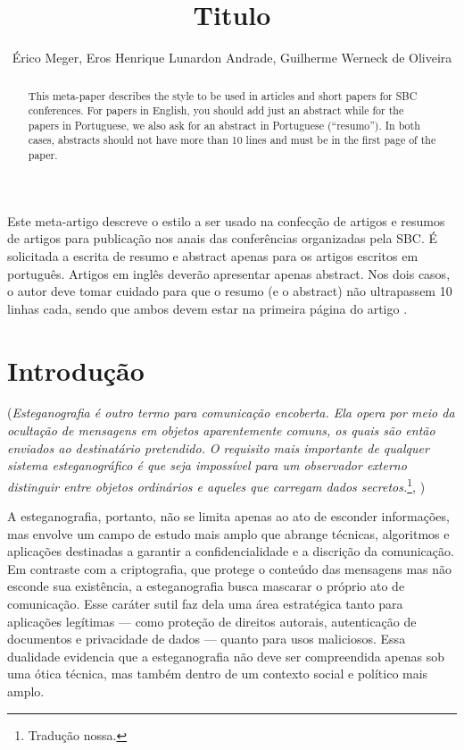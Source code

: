 \documentclass[12pt]{article}
\title{Titulo}
\author{Érico Meger\inst{1}, Eros Henrique Lunardon Andrade\inst{1}, Guilherme Werneck de Oliveira\inst{1}}
\begin{document}
 

\maketitle

\begin{abstract}
  This meta-paper describes the style to be used in articles and short papers
  for SBC conferences. For papers in English, you should add just an abstract
  while for the papers in Portuguese, we also ask for an abstract in
  Portuguese (``resumo''). In both cases, abstracts should not have more than
  10 lines and must be in the first page of the paper.
\end{abstract}
     
\begin{resumo} 
  Este meta-artigo descreve o estilo a ser usado na confecção de artigos e
  resumos de artigos para publicação nos anais das conferências organizadas
  pela SBC. É solicitada a escrita de resumo e abstract apenas para os artigos
  escritos em português. Artigos em inglês deverão apresentar apenas abstract.
  Nos dois casos, o autor deve tomar cuidado para que o resumo (e o abstract)
  não ultrapassem 10 linhas cada, sendo que ambos devem estar na primeira
  página do artigo \cite{AdamaszekAdamaszek10}.
\end{resumo}


\section{Introdução}

(\textit{Esteganografia é outro termo para comunicação encoberta. Ela opera por meio da ocultação de mensagens em objetos aparentemente comuns, 
os quais são então enviados ao destinatário pretendido. O requisito mais importante de qualquer sistema esteganográfico é que seja impossível 
para um observador externo distinguir entre objetos ordinários e aqueles que carregam dados secretos.}\footnote{Tradução nossa.}, \cite{fridrich2009})

A esteganografia, portanto, não se limita apenas ao ato de esconder informações, mas envolve um campo de estudo mais amplo que abrange técnicas, 
algoritmos e aplicações destinadas a garantir a confidencialidade e a discrição da comunicação. Em contraste com a criptografia, que protege 
o conteúdo das mensagens mas não esconde sua existência, a esteganografia busca mascarar o próprio ato de comunicação. Esse caráter sutil 
faz dela uma área estratégica tanto para aplicações legítimas — como proteção de direitos autorais, autenticação de documentos e privacidade 
de dados — quanto para usos maliciosos. Essa dualidade evidencia que a esteganografia não deve ser compreendida apenas sob uma ótica técnica, 
mas também dentro de um contexto social e político mais amplo.
\end{document}
